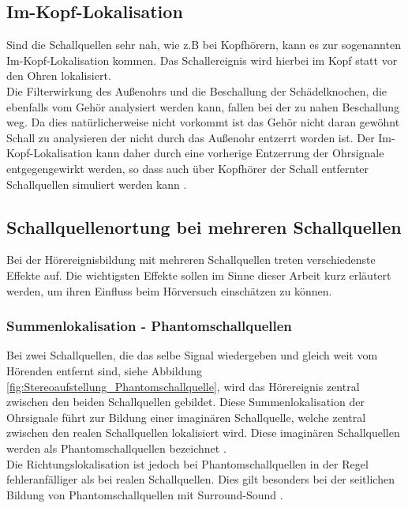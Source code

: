 \subsection{Im-Kopf-Lokalisation}
Sind die Schallquellen sehr nah, wie z.B bei Kopfhörern, kann es zur sogenannten Im-Kopf-Lokalisation kommen. Das Schallereignis wird hierbei im Kopf statt vor den Ohren lokalisiert. \\ 

Die Filterwirkung des Außenohrs und die Beschallung der Schädelknochen, die ebenfalls vom Gehör analysiert werden kann, fallen bei der zu nahen Beschallung weg. Da dies natürlicherweise nicht vorkommt ist das Gehör nicht daran gewöhnt Schall zu analysieren der nicht durch das Außenohr entzerrt worden ist. Der Im-Kopf-Lokalisation kann daher durch eine vorherige Entzerrung der Ohrsignale entgegengewirkt werden, so dass auch über Kopfhörer der Schall entfernter Schallquellen simuliert werden kann \cite[S.47]{Blauert80}.

\subsection{Schallquellenortung bei mehreren Schallquellen}

Bei der Hörereignisbildung mit mehreren Schallquellen treten verschiedenste Effekte auf. Die wichtigsten Effekte sollen im Sinne dieser Arbeit kurz erläutert werden, um ihren Einfluss beim Hörversuch einschätzen zu können. 

\subsubsection{Summenlokalisation - Phantomschallquellen}

Bei zwei Schallquellen, die das selbe Signal wiedergeben und gleich weit vom Hörenden entfernt sind, siehe Abbildung \ref{fig:Stereoaufstellung_Phantomschallquelle}, wird das Hörereignis zentral zwischen den beiden Schallquellen gebildet. Diese Summenlokalisation der Ohrsignale führt zur Bildung einer imaginären Schallquelle, welche zentral zwischen den realen Schallquellen lokalisiert wird. Diese imaginären Schallquellen werden als Phantomschallquellen bezeichnet  \cite[S.101]{HdA08}. \\

Die Richtungslokalisation ist jedoch bei Phantomschallquellen in der Regel fehleranfälliger als bei realen Schallquellen. Dies gilt besonders bei der seitlichen Bildung von Phantomschallquellen mit Surround-Sound  \cite[S.103]{HdA08}. 

